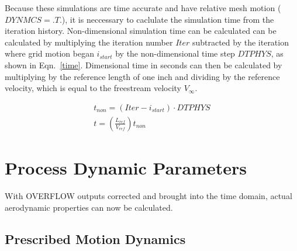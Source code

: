 \documentclass[]{aiaa-tc}%
\begin{document}
Because these simulations are time accurate and have relative mesh motion ($DYNMCS=.T.$), it is neccessary to caclulate the simulation time from the iteration history.  Non-dimensional simulation time can be calculated can be calculated by multiplying the iteration number $Iter$ subtracted by the iteration where grid motion began $i_{start}$ by the non-dimensional time step $DTPHYS$, as shown in Eqn.~\ref{time}.  Dimensional time in seconds can then be calculated by multiplying by the reference length of one inch and dividing by the reference velocity, which is equal to the freestream velocity $V_{\infty}$.

\begin{equation}
\begin{gathered}
t_{non} = (Iter - i_{start}) \cdot DTPHYS \\
t = \left(\frac{L_{ref}}{V_{ref}}\right) t_{non}
\end{gathered}
\label{time}
\end{equation}


% 



\section{Process Dynamic Parameters} %



With OVERFLOW outputs corrected and brought into the time domain, actual aerodynamic properties can now be calculated.

\subsection{Prescribed Motion Dynamics}
\end{document}
